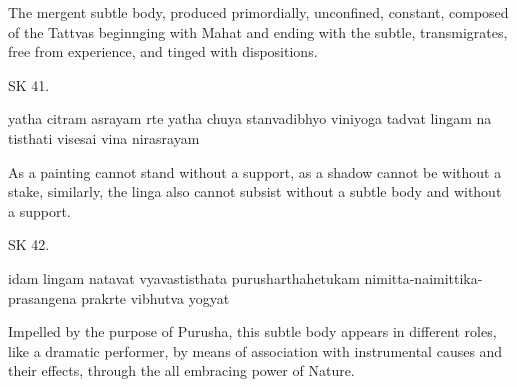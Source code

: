 The mergent subtle body, produced primordially,
unconfined, constant, composed of the Tattvas beginnging with
Mahat and ending with the subtle, transmigrates, free from experience,
and tinged with dispositions.

SK 41.

yatha citram asrayam rte yatha chuya stanvadibhyo viniyoga
tadvat lingam na tisthati visesai vina nirasrayam

As a painting cannot stand without a support,
as a shadow cannot be without a stake,
similarly, the linga also cannot subsist
without a subtle body and without a support.

SK 42.

idam lingam natavat vyavastisthata purusharthahetukam
nimitta-naimittika-prasangena prakrte vibhutva yogyat

Impelled by the purpose of Purusha, this subtle body
appears in different roles, like a dramatic performer,
by means of association with instrumental causes and their effects,
through the all embracing power of Nature.
